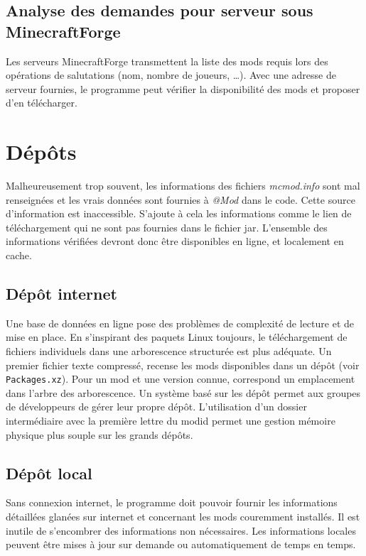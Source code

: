 \documentclass{article}
\begin{document}
\subsection{Analyse des demandes pour serveur sous MinecraftForge}
Les serveurs MinecraftForge transmettent la liste des mods requis lors des opérations de salutations (nom, nombre de joueurs, \dots).
Avec une adresse de serveur fournies, le programme peut vérifier la disponibilité des mods et proposer d'en télécharger.


\section{Dépôts}
\label{section:depot}
Malheureusement trop souvent, les informations des fichiers \textit{mcmod.info} sont mal renseignées et les vrais données sont fournies à \textit{@Mod} dans le code.
Cette source d'information est inaccessible.
S'ajoute à cela les informations comme le lien de téléchargement qui ne sont pas fournies dans le fichier jar.
L'ensemble des informations vérifiées devront donc être disponibles en ligne, et localement en cache.

\subsection{Dépôt internet}
Une base de données en ligne pose des problèmes de complexité de lecture et de mise en place.
En s'inspirant des paquets Linux toujours, le téléchargement de fichiers individuels dans une arborescence structurée est plus adéquate.
Un premier fichier texte compressé, recense les mods disponibles dans un dépôt (voir \texttt{Packages.xz}).
Pour un mod et une version connue, correspond un emplacement dans l'arbre des arborescence.
Un système basé sur les dépôt permet aux groupes de développeurs de gérer leur propre dépôt.
L'utilisation d'un dossier intermédiaire avec la première lettre du modid permet une gestion mémoire physique plus souple sur les grands dépôts.

\subsection{Dépôt local}
Sans connexion internet, le programme doit pouvoir fournir les informations détaillées glanées sur internet et concernant les mods couremment installés.
Il est inutile de s'encombrer des informations non nécessaires.
Les informations locales peuvent être mises à jour sur demande ou automatiquement de temps en temps.
\end{document}
